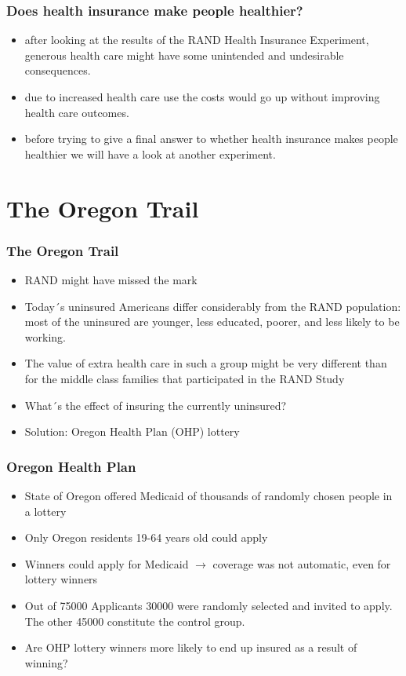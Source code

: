 \documentclass{beamer}
\begin{document}
\begin{frame}
\frametitle{Does health insurance make people healthier?}
\begin{itemize}
	\item after looking at the results of the RAND Health Insurance Experiment, generous health care might have some unintended and undesirable consequences. 
	\item due to increased health care use the costs would go up without improving health care outcomes.
	\item before trying to give a final answer to whether health insurance makes people healthier we will have a look at another experiment.
\end{itemize}

\end{frame}


\section{The Oregon Trail}
\begin{frame}
\frametitle{The Oregon Trail}
\newline 
\begin{itemize}
	\item RAND might have missed the mark
  \item Today´s uninsured Americans differ considerably from the RAND population: most of the
uninsured are younger, less educated, poorer, and less likely to be
working. 
  \item The value of extra health care in such a group might be very
different than for the middle class families that participated in the RAND Study
  \item What´s the effect of insuring the currently uninsured?
  \item Solution: Oregon Health Plan (OHP) lottery
\end{itemize}

\end{frame}


\begin{frame}
\frametitle{Oregon Health Plan}
\begin{itemize}
	\item State of Oregon offered Medicaid of thousands of randomly chosen people in a lottery
	\item Only Oregon residents 19-64 years old could apply
	\item Winners could apply for Medicaid $\rightarrow$ coverage
was not automatic, even for lottery winners
	\item Out of 75000 Applicants 30000 were randomly selected and invited to apply. The other 45000 constitute the control group.
	\item Are OHP lottery winners more likely to end up insured as a result of winning?
\end{itemize}


\end{frame}
\end{document}
